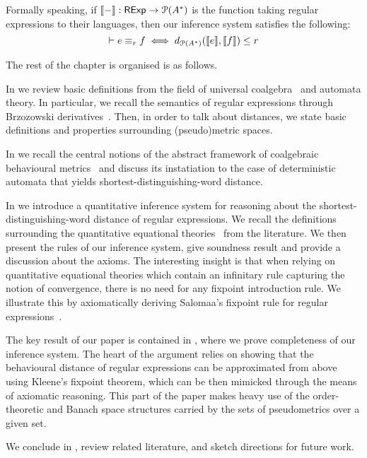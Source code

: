 Formally speaking, if $\left\llbracket{-}\right\rrbracket: \mathsf{RExp} \to \mathcal{P} ({A}^*)$ is the function taking regular expressions to their languages, then our inference system satisfies the following:
$$
	\vdash e \equiv_r f \iff d_{\mathcal{P}({A}^{\ast})}(\llbracket e \rrbracket, \llbracket f \rrbracket) \leq r
$$ 

The rest of the chapter is organised is as follows.

In  we review basic definitions from the field of universal coalgebra~\cite{Rutten:2000:Universal,Gumm:2000:Elements} and automata theory. In particular, we recall the semantics of regular expressions through Brzozowski derivatives~\cite{Brzozowski:1964:Expressions}. Then, in order to talk about distances, we state basic definitions and properties surrounding (pseudo)metric spaces.

In  we recall the central notions of the abstract framework of coalgebraic behavioural metrics~\cite{Baldan:2018:Coalgebraic} and discuss its instatiation to the case of deterministic automata that yields shortest-distinguishing-word distance.
	
In  we introduce a quantitative inference system for reasoning about the shortest-distinguishing-word distance of regular expressions. We recall the definitions surrounding the quantitative equational theories~\cite{Mardare:2016:Quantitative} from the literature. We then present the rules of our inference system, give soundness result and provide a discussion about the axioms. The interesting insight is that when relying on quantitative equational theories which contain an infinitary rule capturing the notion of convergence, there is no need for any fixpoint introduction rule. We illustrate this by axiomatically deriving Salomaa's fixpoint rule for regular expressions~\cite{Salomaa:1966:Two}.

The key result of our paper is contained in , where we prove completeness of our inference system. The heart of the argument relies on showing that the behavioural distance of regular expressions can be approximated from above using Kleene's fixpoint theorem, which can be then mimicked through the means of axiomatic reasoning. This part of the paper makes heavy use of the order-theoretic and Banach space structures carried by the sets of pseudometrics over a given set.

We conclude in , review related literature, and sketch directions for future work.

